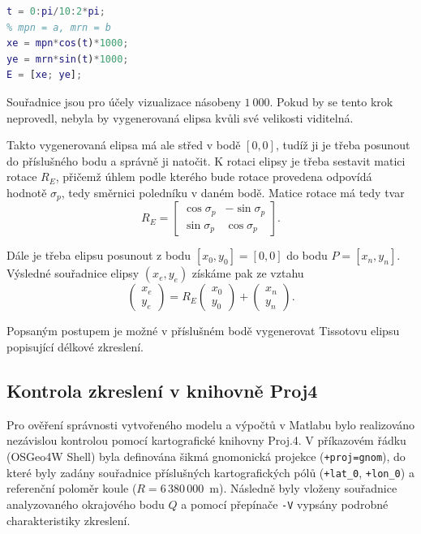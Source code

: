 \documentclass[12pt]{article}
\begin{document}
\begin{lstlisting}[language=Matlab]
% elipsa
t = 0:pi/10:2*pi;
% mpn = a, mrn = b
xe = mpn*cos(t)*1000;
ye = mrn*sin(t)*1000;
E = [xe; ye];
\end{lstlisting}

Souřadnice jsou pro účely vizualizace násobeny $1~000$. Pokud by se tento krok neprovedl, nebyla by vygenerovaná elipsa kvůli své velikosti viditelná.

Takto vygenerovaná elipsa má ale střed v bodě $[0, 0]$, tudíž ji je třeba posunout do příslušného bodu a správně ji natočit. K rotaci elipsy je třeba sestavit matici rotace $R_E$, přičemž úhlem podle kterého bude rotace provedena odpovídá hodnotě $\sigma_p$, tedy směrnici poledníku v daném bodě. Matice rotace má tedy tvar
$$ R_E = \begin{bmatrix} \cos\sigma_p & -\sin\sigma_p \\ \sin\sigma_p & \cos\sigma_p \end{bmatrix}. $$

Dále je třeba elipsu posunout z bodu $[x_0, y_0] = [0, 0]$ do bodu $P = [x_n, y_n]$. Výsledné souřadnice elipsy $(x_e, y_e)$ získáme pak ze vztahu
$$ \begin{pmatrix} x_e \\ y_e \end{pmatrix} = R_E \begin{pmatrix} x_0 \\ y_0 \end{pmatrix} + \begin{pmatrix} x_n \\ y_n \end{pmatrix}. $$

Popsaným postupem je možné v příslušném bodě vygenerovat Tissotovu elipsu popisující délkové zkreslení.

{\subsection {Kontrola zkreslení v knihovně Proj4}}
Pro ověření správnosti vytvořeného modelu a výpočtů v Matlabu bylo realizováno nezávislou kontrolou pomocí kartografické knihovny Proj.4. V příkazovém řádku (OSGeo4W Shell) byla definována šikmá gnomonická projekce (\texttt{+proj=gnom}), do které byly zadány souřadnice příslušných kartografických pólů (\texttt{+lat\_0}, \texttt{+lon\_0}) a referenční poloměr koule ($R = 6\,380\,000$~m). Následně byly vloženy souřadnice analyzovaného okrajového bodu $Q$ a pomocí přepínače \texttt{-V} vypsány podrobné charakteristiky zkreslení.
\end{document}
